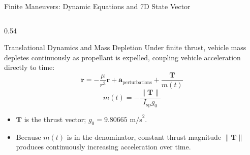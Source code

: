 \documentclass[aspectratio=169, 10pt]{beamer}
\begin{document}
\begin{frame}{Finite Maneuvers: Dynamic Equations and 7D State Vector}
    \begin{columns}[T]
        \begin{column}{0.54\textwidth}
            \begin{block}{Translational Dynamics and Mass Depletion}
                \scriptsize
                Under finite thrust, vehicle mass depletes continuously as propellant is expelled, coupling vehicle acceleration directly to time:
                \begin{equation}
                    \ddot{\mathbf{r}} = -\frac{\mu}{r^3}\mathbf{r} + \mathbf{a}_{\text{perturbations}} + \frac{\mathbf{T}}{m(t)}
                \end{equation}
                \begin{equation}
                    \dot{m}(t) = -\frac{\|\mathbf{T}\|}{I_{\text{sp}} g_0}
                \end{equation}
                \begin{itemize}\setlength{\itemsep}{1.5pt}
                    \item $\mathbf{T}$ is the thrust vector; $g_0 = 9.80665\text{ m/s}^2$.
                    \item Because $m(t)$ is in the denominator, constant thrust magnitude $\|\mathbf{T}\|$ produces continuously increasing acceleration over time.
                \end{itemize}
            \end{block}
        \end{column}


\end{columns}
\end{frame}
\end{document}
